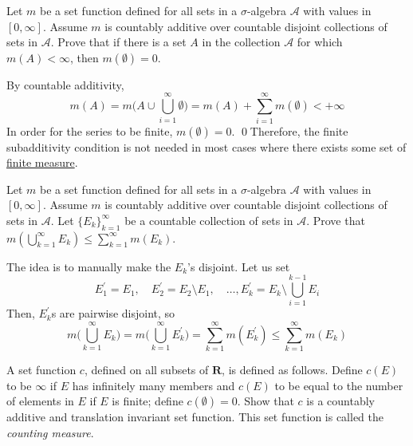   \begin{exercise}[Royden 2.2]
    Let $m$ be a set function defined for all sets in a $\sigma$-algebra $\mathcal{A}$ with values in $[0, \infty]$. Assume $m$ is countably additive over countable disjoint collections of sets in $\mathcal{A}$. Prove that if there is a set $A$ in the collection $\mathcal{A}$ for which $m(A) < \infty$, then $m(\emptyset) = 0$.
  \end{exercise}
  \begin{solution}
    By countable additivity, 
    \begin{equation}
      m(A) = m\bigg( A \cup \bigcup_{i=1}^\infty \emptyset \bigg) = m(A) + \sum_{i=1}^\infty m(\emptyset) < +\infty 
    \end{equation}
    In order for the series to be finite, $m(\emptyset) = 0$. \qed Therefore, the finite subadditivity condition is not needed in most cases where there exists some set of \hyperref[def:finite-measure]{finite measure}. 
  \end{solution}

  \begin{exercise}[Royden 2.3]
    Let $m$ be a set function defined for all sets in a $\sigma$-algebra $\mathcal{A}$ with values in $[0, \infty]$. Assume $m$ is countably additive over countable disjoint collections of sets in $\mathcal{A}$. Let $\{E_k\}_{k=1}^{\infty}$ be a countable collection of sets in $\mathcal{A}$. Prove that $m(\bigcup_{k=1}^{\infty} E_k) \leq \sum_{k=1}^{\infty} m(E_k)$.
  \end{exercise}
  \begin{solution}
    The idea is to manually make the $E_k$'s disjoint. Let us set 
    \begin{equation}
      E_1^\prime = E_1, \quad E_2^\prime = E_2 \setminus E_1, \quad \ldots, E_k^\prime = E_k \setminus \bigcup_{i=1}^{k-1} E_i 
    \end{equation}
    Then, $E_k^\prime$s are pairwise disjoint, so 
    \begin{equation}
      m \bigg( \bigcup_{k=1}^\infty E_k \bigg) = m \bigg( \bigcup_{k=1}^\infty E_k^\prime \bigg) = \sum_{k=1}^\infty m(E_k^\prime) \leq \sum_{k=1}^\infty m(E_k)
    \end{equation}
  \end{solution}

  \begin{exercise}[Royden 2.4]
    A set function $c$, defined on all subsets of $\mathbf{R}$, is defined as follows. Define $c(E)$ to be $\infty$ if $E$ has infinitely many members and $c(E)$ to be equal to the number of elements in $E$ if $E$ is finite; define $c(\emptyset) = 0$. Show that $c$ is a countably additive and translation invariant set function. This set function is called the \emph{counting measure}.
  \end{exercise}

